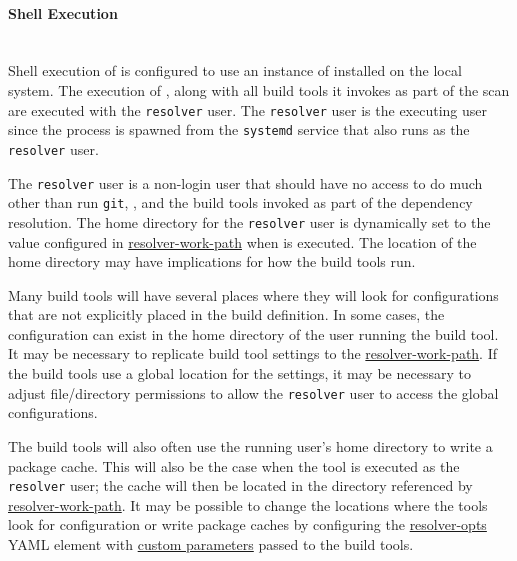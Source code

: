 \paragraph{Shell Execution}\label{par:agent-shell-execution}

\noindent\\Shell execution of \scaresolver is configured to use an instance of \scaresolver installed on the local system.
The execution of \scaresolverns, along with all build tools it invokes as part of the scan are executed with the \texttt{resolver}
user.  The \texttt{resolver} user is the executing user since the process is spawned from the \texttt{systemd} service that also
runs as the \texttt{resolver} user.

The \texttt{resolver} user is a non-login user that should have no access to do much other than run \texttt{git}, \scaresolverns, and
the build tools invoked as part of the dependency resolution.  The home directory for the \texttt{resolver} user is dynamically set
to the value configured in \hyperref[sec:agent-resolver-work-path]{resolver-work-path} when \scaresolver is executed.  The location
of the home directory may have implications for how the build tools run.

Many build tools will have several places where they will look for configurations that are not explicitly placed in the build
definition.  In some cases, the configuration can exist in the home directory of the user running the build tool.  It may be necessary
to replicate build tool settings to the \hyperref[sec:agent-resolver-work-path]{resolver-work-path}.  If the build tools use a global location
for the settings, it may be necessary to adjust file/directory permissions to allow the \texttt{resolver} user to access the global
configurations.

The build tools will also often use the running user's home directory to write a package cache.  This will also be the case
when the tool is executed as the \texttt{resolver} user; the cache will then be located in the directory referenced by
\hyperref[sec:agent-resolver-work-path]{resolver-work-path}. It may be possible to change the locations where the tools look
for configuration or write package caches by configuring the
\hyperref[sec:agent-resolver-opts]{resolver-opts} YAML element with
\href{https://docs.checkmarx.com/en/34965-132888-checkmarx-sca-resolver-configuration-arguments.html#UUID-bc93274b-c1c7-ea47-9556-3bd8900711dc_id_CheckmarxSCAResolverConfigurationArguments-CustomParameters}
{custom parameters} passed to the build tools.

